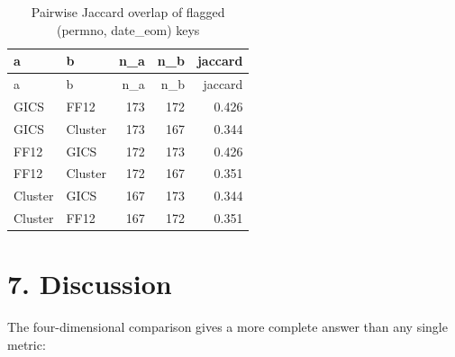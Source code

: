 \documentclass[
  letterpaper,
  DIV=11,
  numbers=noendperiod]{scrartcl}
\begin{document}
\begin{longtable}[]{@{}llrrr@{}}
\caption{Pairwise Jaccard overlap of flagged (permno, date\_eom)
keys}\tabularnewline
\toprule\noalign{}
a & b & n\_a & n\_b & jaccard \\
\midrule\noalign{}
\endfirsthead
\toprule\noalign{}
a & b & n\_a & n\_b & jaccard \\
\midrule\noalign{}
\endhead
\bottomrule\noalign{}
\endlastfoot
GICS & FF12 & 173 & 172 & 0.426 \\
GICS & Cluster & 173 & 167 & 0.344 \\
FF12 & GICS & 172 & 173 & 0.426 \\
FF12 & Cluster & 172 & 167 & 0.351 \\
Cluster & GICS & 167 & 173 & 0.344 \\
Cluster & FF12 & 167 & 172 & 0.351 \\
\end{longtable}

\section{7. Discussion}\label{discussion}

The four-dimensional comparison gives a more complete answer than any
single metric:
\end{document}
